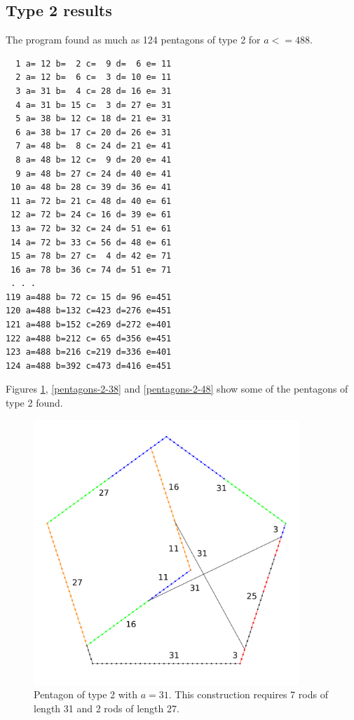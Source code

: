 \documentclass[11pt]{article}
\begin{document}
\subsection{Type 2 results}
The program found as much as 124 pentagons of type 2 for $a <= 488$.

\begin{lstlisting}
  1 a= 12 b=  2 c=  9 d=  6 e= 11
  2 a= 12 b=  6 c=  3 d= 10 e= 11
  3 a= 31 b=  4 c= 28 d= 16 e= 31
  4 a= 31 b= 15 c=  3 d= 27 e= 31
  5 a= 38 b= 12 c= 18 d= 21 e= 31
  6 a= 38 b= 17 c= 20 d= 26 e= 31
  7 a= 48 b=  8 c= 24 d= 21 e= 41
  8 a= 48 b= 12 c=  9 d= 20 e= 41
  9 a= 48 b= 27 c= 24 d= 40 e= 41
 10 a= 48 b= 28 c= 39 d= 36 e= 41
 11 a= 72 b= 21 c= 48 d= 40 e= 61
 12 a= 72 b= 24 c= 16 d= 39 e= 61
 13 a= 72 b= 32 c= 24 d= 51 e= 61
 14 a= 72 b= 33 c= 56 d= 48 e= 61
 15 a= 78 b= 27 c=  4 d= 42 e= 71
 16 a= 78 b= 36 c= 74 d= 51 e= 71
 . . .
119 a=488 b= 72 c= 15 d= 96 e=451
120 a=488 b=132 c=423 d=276 e=451
121 a=488 b=152 c=269 d=272 e=401
122 a=488 b=212 c= 65 d=356 e=451
123 a=488 b=216 c=219 d=336 e=401
124 a=488 b=392 c=473 d=416 e=451
\end{lstlisting}

Figures \ref{pentagons-2-31}, \ref{pentagons-2-38} and \ref{pentagons-2-48} show some of the pentagons of type 2 found.

\begin{figure}
\centering
\includegraphics[width=10cm]{figs/pentagons-2-31}
\caption{Pentagon of type 2 with $a=31$. This construction requires 7 rods of 
length 31 and 2 rods of length 27.}
\label{pentagons-2-31}
\end{figure}
\end{document}

